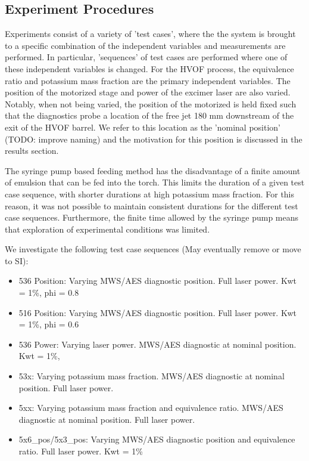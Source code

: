 \subsection{Experiment Procedures}

Experiments consist of a variety of 'test cases', where the the system is brought to a specific combination of the independent variables and measurements are performed. In particular, 'sequences' of test cases are performed where one of these independent variables is changed. For the HVOF process, the equivalence ratio and potassium mass fraction are the primary independent variables. The position of the motorized stage and power of the excimer laser are also varied. Notably, when not being varied, the position of the motorized is held fixed such that the diagnostics probe a location of the free jet 180 mm downstream of the exit of the HVOF barrel. We refer to this location as the 'nominal position' (TODO: improve naming) and the motivation for this position is discussed in the results section.  

The syringe pump based feeding method has the disadvantage of a finite amount of emulsion that can be fed into the torch. This limits the duration of a given test case sequence, with shorter durations at high potassium mass fraction. For this reason, it was not possible to maintain consistent durations for the different test case sequences. Furthermore, the finite time allowed by the syringe pump means that exploration of experimental conditions was limited. 

We investigate the following test case sequences (May eventually remove or move to SI):
\begin{itemize}
    \item 536 Position: Varying MWS/AES diagnostic position. Full laser power. Kwt = 1\%, phi = 0.8
    \item 516 Position: Varying MWS/AES diagnostic position. Full laser power. Kwt = 1\%, phi = 0.6
    \item 536 Power: Varying laser power. MWS/AES diagnostic at nominal position. Kwt = 1\%, 
    \item 53x: Varying potassium mass fraction. MWS/AES diagnostic at nominal position. Full laser power.
    \item 5xx: Varying potassium mass fraction and equivalence ratio. MWS/AES diagnostic at nominal position. Full laser power.
    \item 5x6\_pos/5x3\_pos: Varying MWS/AES diagnostic position and equivalence ratio. Full laser power. Kwt = 1\%
\end{itemize}

